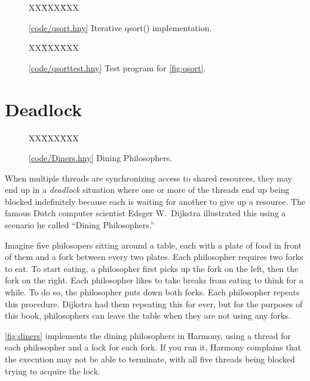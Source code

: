 \documentclass{report}
\newcommand{\harmonysource}[1]{
\begin{tabbing}
XX\=XXX\=XXX\kill
    
\end{tabbing}
}
\newcommand{\harmonylink}[1]{%
[\href{https://harmony.cs.cornell.edu/#1}{\underline{#1}}]%
}
\newenvironment{code}{
\tcolorbox
}{
\endtcolorbox
}
\begin{document}
\begin{figure}
\begin{code}
\harmonysource{qsort}
\end{code}
\caption{\harmonylink{code/qsort.hny} Iterative qsort() implementation.}
\label{fig:qsort}
\end{figure}

\begin{figure}
\begin{code}
\harmonysource{qsorttest}
\end{code}
\caption{\harmonylink{code/qsorttest.hny} Test program for \autoref{fig:qsort}.}
\label{fig:qsorttest}
\end{figure}

\chapter{Deadlock}
\label{ch:deadlock}
%

%

\begin{figure}
\begin{code}
\harmonysource{Diners}
\end{code}
\caption{\harmonylink{code/Diners.hny} Dining Philosophers.}
\label{fig:diners}
\end{figure}

When multiple threads are synchronizing access to shared resources, they
may end up in a \emph{deadlock} situation where one or more of the threads
end up being blocked indefinitely because each is waiting for another to give
up a resource.
The famous Dutch computer scientist Edsger W.~Dijkstra illustrated this using
a scenario he called ``Dining Philosophers.''
%

Imagine five philosopers sitting around a table, each with a plate of food in
front of them and a fork between every two plates.  Each philosopher requires
two forks to eat.  To start eating, a philosopher first picks up the fork on
the left, then the fork on the right.  Each philosopher likes to take breaks
from eating to think for a while.  To do so, the philosopher puts down both
forks.  Each philosopher repeats this procedure.  Dijkstra had them repeating
this for ever, but for the purposes of this book, philosophers can leave
the table when they are not using any forks.

\autoref{fig:diners} implements the dining philosophers in Harmony, using a
thread for each philosopher and a lock for each fork.  If you
run it, Harmony complains that the execution may not be able to terminate,
with all five threads being blocked trying to acquire the lock.
\end{document}
